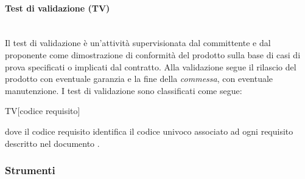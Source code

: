 		\paragraph{Test di validazione (TV)}
		~\\Il test di validazione è un'attività supervisionata dal committente e dal proponente come dimostrazione di conformità del prodotto sulla base 
		di casi di prova specificati o implicati dal contratto.
		Alla validazione segue il rilascio del prodotto con eventuale garanzia e la fine della
		\emph{commessa},	con eventuale manutenzione. I test di validazione sono classificati come segue:
		\begin{center} TV[codice requisito]\end{center}
		dove il codice requisito identifica	il codice univoco associato ad ogni requisito descritto nel documento \AdR.
	
	\subsubsection{Strumenti}

